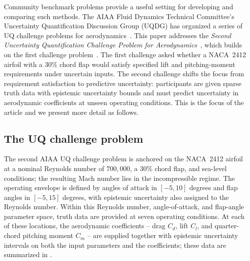 \documentclass[journal]{new-aiaa}
\begin{document}
Community benchmark problems provide a useful setting for developing and comparing such methods. The AIAA Fluid Dynamics Technical Committee's Uncertainty Quantification Discussion Group (UQDG) has organized a series of UQ challenge problems for aerodynamics~\cite{Cary2022}. This paper addresses the \emph{Second Uncertainty Quantification Challenge Problem for Aerodynamics}~\cite{cary2026summary}, which builds on the first challenge problem~\cite{cary2024overview}. The first challenge asked whether a NACA~2412 airfoil with a 30\% chord flap would satisfy specified lift and pitching-moment requirements under uncertain inputs. The second challenge shifts the focus from requirement satisfaction to predictive uncertainty: participants are given sparse truth data with epistemic uncertainty bounds and must predict uncertainty in aerodynamic coefficients at unseen operating conditions. This is the focus of the article and we present more detail as follows.

%


\subsection{The UQ challenge problem}
\label{sec:uqchallenge}
The second AIAA UQ challenge problem is anchored on the NACA~2412 airfoil at a nominal Reynolds number of $700{,}000$, a 30\% chord flap, and sea-level conditions; the resulting Mach number lies in the incompressible regime. The operating envelope is defined by angles of attack in $[-5,10]$ degrees and flap angles in $[-5,15]$ degrees, with epistemic uncertainty also assigned to the Reynolds number. Within this Reynolds number, angle-of-attack, and flap-angle parameter space, truth data are provided at seven operating conditions. At each of these locations, the aerodynamic coefficients -- drag $C_d$, lift $C_l$, and quarter-chord pitching moment $C_m$ -- are supplied together with epistemic uncertainty intervals on both the input parameters and the coefficients; these data are summarized in .
\end{document}

